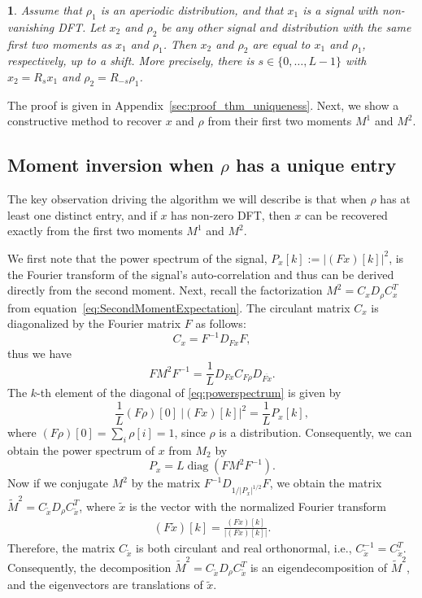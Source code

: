 \documentclass{IEEEtran}
\numberwithin{equation}{section}
\numberwithin{figure}{section}
\theoremstyle{plain}
\newtheorem{thm}{\protect\theoremname}[section]
\theoremstyle{definition}
\theoremstyle{remark}
\theoremstyle{plain}
\theoremstyle{remark}
\theoremstyle{plain}
\theoremstyle{plain}
\theoremstyle{remark}
\providecommand{\theoremname}{Theorem}
\newcommand{\F}{F}
\DeclareMathOperator*{\diag}{diag}
\begin{document}
\begin{thm} \label{thm:uniqueness}
Assume that $\rho_1$ is an aperiodic distribution, and that $x_1$ is a signal with non-vanishing DFT. Let $x_2$ and $\rho_2$ be any other signal and distribution with the same first two moments as $x_1$ and $\rho_1$. Then $x_2$ and $\rho_2$ are equal to $x_1$ and $\rho_1$, respectively, up to a shift. More precisely, there is $s \in \{0,\dots,L-1\}$ with $x_2 = R_s x_1$ and $\rho_2 = R_{-s} \rho_1$.
\end{thm}

The proof is given in Appendix~\ref{sec:proof_thm_uniqueness}. Next, we show a constructive method to recover $x$ and $\rho$ from their first two moments $M^1$ and $M^2$.
    
\subsection{Moment inversion when $\rho$ has a unique entry} 
\label{sec:moment-inversion}

The key observation driving the algorithm we will describe is that when $\rho$ has at least one distinct entry, and if $x$ has non-zero DFT, then $x$ can be recovered exactly from the first two moments $M^1$ and $M^2$.

We first note that the power spectrum of the signal, $P_x[k]:= \vert (\F x)[k]\vert^2$, is the Fourier transform of the signal's auto-correlation and thus can be derived directly from the second moment. 
Next, recall the factorization $M^2 = C_x D_\rho C_x^T$ from equation~\eqref{eq:SecondMomentExpectation}. The circulant matrix $C_x$ is diagonalized by the Fourier matrix $F$ as follows:
\[ C_x = F^{-1} D_{Fx} F, \]
thus we have
\begin{equation}\label{eq:powerspectrum}
F M^2 F^{-1} = \frac{1}{L} D_{Fx} C_{F \rho} D_{\overline{Fx}}.
\end{equation}
The $k$-th element of the diagonal of \eqref{eq:powerspectrum} is given by $$\frac1L(F \rho)[0]~\vert (\F x)[k]\vert^2=\frac1LP_x[k],$$
where $(F\rho)[0]=\sum_i \rho[i]=1$, since $\rho$ is a distribution. Consequently, we can obtain the power spectrum of $x$ from $M_2$ by
%
\begin{equation} \label{eq:psfrommoment}
%
	P_x=L\diag(F M^2 F^{-1}). 
%
\end{equation}
Now if we conjugate $M^2$ by the matrix $F^{-1} D_{1/|P_x|^{1/2}} F$, we obtain the matrix $\widetilde{M}^2 = C_{\tilde x} D_\rho C_{\tilde x}^T$, where $\tilde x$ is the vector with the normalized Fourier transform 
%
\begin{align} \label{eq:tilde_x}
%
    (F \tilde{x})[k] = \frac{(F x)[k]} {|(Fx)[k]|}.
%
\end{align}
%
Therefore, the matrix $C_{\tilde x}$ is both circulant and real orthonormal, i.e., $C_{\tilde x}^{-1} = C_{\tilde x}^T$. Consequently, the decomposition $\widetilde{M}^2 = C_{\tilde x} D_\rho C_{\tilde x}^T$ is an eigendecomposition of $\widetilde{M}^2$, and the eigenvectors are translations of $\tilde{x}$.
\end{document}
